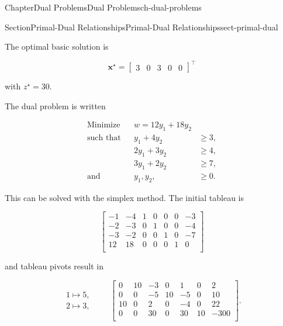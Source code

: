 \documentclass[oneside,10pt,]{book}
\numberwithin{equation}{section}
\newcommand{\amp}{&}
\begin{document}
\begin{chapterptx}{Chapter}{Dual Problems}{}{Dual Problems}{}{}{ch-dual-problems}
\begin{sectionptx}{Section}{Primal-Dual Relationships}{}{Primal-Dual Relationships}{}{}{sect-primal-dual}
\begin{equation*}
\end{equation*}
%
\par
The optimal basic solution is%
\par
%
\begin{equation*}
\boldsymbol{x}^{\star} = \left[\begin{array}{rrr|rr} 3 \amp 0 \amp 3 \amp 0 \amp 0 \end{array}\right]^{\intercal}
\end{equation*}
%
\par
with \(z^{\star} = 30\).%
\par
The dual problem is written%
\par
%
\begin{equation*}
\begin{aligned} \text{Minimize} \amp\amp w  = 12y_1 +18 y_2 \amp\\ \text{such that} \amp\amp y_1 + 4y_2 \amp\geq 3, \\ \amp\amp2y_1 + 3y_2 \amp \geq 4, \\ \amp\amp 3y_1 + 2y_2 \amp \geq 7, \\ \text{and} \amp\amp y_1, y_2, \amp \geq 0.
\end{aligned}
\end{equation*}
%
\par
This can be solved with the simplex method. The initial tableau is%
\par
%
\begin{equation*}
\left[\begin{array}{rr|rrrr|r} -1 \amp -4 \amp 1 \amp 0 \amp 0 \amp 0 \amp -3\\ -2 \amp -3 \amp 0 \amp 1 \amp 0 \amp 0 \amp -4\\ -3 \amp -2 \amp 0 \amp 0 \amp 1 \amp 0 \amp -7\\ \hline 12 \amp 18 \amp 0 \amp 0 \amp 0 \amp 1 \amp 0\\ \end{array} \right]
\end{equation*}
%
\par
and tableau pivots result in%
\par
%
\begin{equation}
\begin{array}{r} 1 \mapsto 5, \\ 2 \mapsto 3, \end{array} \qquad \left[\begin{array}{rr|rrrr|r} 0 \amp 10 \amp -3 \amp 0 \amp 1 \amp 0 \amp 2\\ 0 \amp 0 \amp -5 \amp 10 \amp -5 \amp 0 \amp 10\\ 10 \amp 0 \amp 2 \amp 0 \amp -4 \amp 0 \amp 22\\ \hline 0 \amp 0 \amp 30 \amp 0 \amp 30 \amp 10 \amp -300\\ \end{array} \right].\label{eq-ex-dual-tableau-solution}

\end{equation}
\end{sectionptx}
\end{chapterptx}
\end{document}
